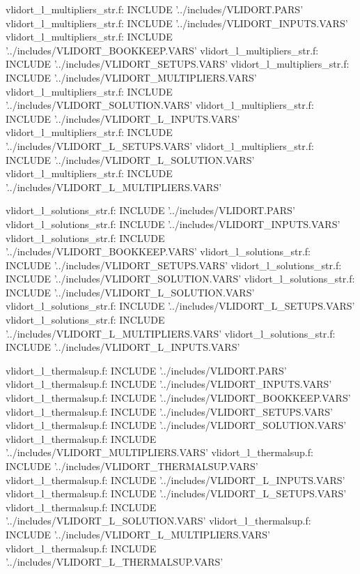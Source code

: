 vlidort_l_multipliers_str.f:      INCLUDE '../includes/VLIDORT.PARS'
vlidort_l_multipliers_str.f:      INCLUDE '../includes/VLIDORT_INPUTS.VARS'
vlidort_l_multipliers_str.f:      INCLUDE '../includes/VLIDORT_BOOKKEEP.VARS'
vlidort_l_multipliers_str.f:      INCLUDE '../includes/VLIDORT_SETUPS.VARS'
vlidort_l_multipliers_str.f:      INCLUDE '../includes/VLIDORT_MULTIPLIERS.VARS'
vlidort_l_multipliers_str.f:      INCLUDE '../includes/VLIDORT_SOLUTION.VARS'
vlidort_l_multipliers_str.f:      INCLUDE '../includes/VLIDORT_L_INPUTS.VARS'
vlidort_l_multipliers_str.f:      INCLUDE '../includes/VLIDORT_L_SETUPS.VARS'
vlidort_l_multipliers_str.f:      INCLUDE '../includes/VLIDORT_L_SOLUTION.VARS'
vlidort_l_multipliers_str.f:      INCLUDE '../includes/VLIDORT_L_MULTIPLIERS.VARS'

vlidort_l_solutions_str.f:      INCLUDE '../includes/VLIDORT.PARS'
vlidort_l_solutions_str.f:      INCLUDE '../includes/VLIDORT_INPUTS.VARS'
vlidort_l_solutions_str.f:      INCLUDE '../includes/VLIDORT_BOOKKEEP.VARS'
vlidort_l_solutions_str.f:      INCLUDE '../includes/VLIDORT_SETUPS.VARS'
vlidort_l_solutions_str.f:      INCLUDE '../includes/VLIDORT_SOLUTION.VARS'
vlidort_l_solutions_str.f:      INCLUDE '../includes/VLIDORT_L_SOLUTION.VARS'
vlidort_l_solutions_str.f:      INCLUDE '../includes/VLIDORT_L_SETUPS.VARS'
vlidort_l_solutions_str.f:      INCLUDE '../includes/VLIDORT_L_MULTIPLIERS.VARS'
vlidort_l_solutions_str.f:      INCLUDE '../includes/VLIDORT_L_INPUTS.VARS'

vlidort_l_thermalsup.f:      INCLUDE '../includes/VLIDORT.PARS'
vlidort_l_thermalsup.f:      INCLUDE '../includes/VLIDORT_INPUTS.VARS'
vlidort_l_thermalsup.f:      INCLUDE '../includes/VLIDORT_BOOKKEEP.VARS'
vlidort_l_thermalsup.f:      INCLUDE '../includes/VLIDORT_SETUPS.VARS'
vlidort_l_thermalsup.f:      INCLUDE '../includes/VLIDORT_SOLUTION.VARS'
vlidort_l_thermalsup.f:      INCLUDE '../includes/VLIDORT_MULTIPLIERS.VARS'
vlidort_l_thermalsup.f:      INCLUDE '../includes/VLIDORT_THERMALSUP.VARS'
vlidort_l_thermalsup.f:      INCLUDE '../includes/VLIDORT_L_INPUTS.VARS'
vlidort_l_thermalsup.f:      INCLUDE '../includes/VLIDORT_L_SETUPS.VARS'
vlidort_l_thermalsup.f:      INCLUDE '../includes/VLIDORT_L_SOLUTION.VARS'
vlidort_l_thermalsup.f:      INCLUDE '../includes/VLIDORT_L_MULTIPLIERS.VARS'
vlidort_l_thermalsup.f:      INCLUDE '../includes/VLIDORT_L_THERMALSUP.VARS'

